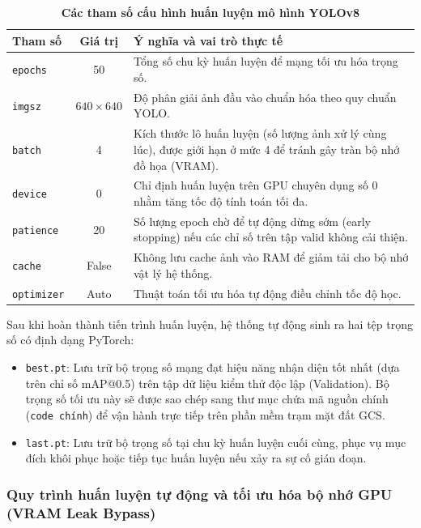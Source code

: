 \begin{table}[H]
    \centering
    \caption[Các tham số cấu hình huấn luyện mô hình YOLOv8]{\bfseries\fontsize{12pt}{0pt}\selectfont Các tham số cấu hình huấn luyện mô hình YOLOv8}
    \begin{tabular}{|l|c|p{8cm}|}
    \hline
    \rowcolor{LightCyan}
    \textbf{Tham số} & \textbf{Giá trị} & \textbf{Ý nghĩa và vai trò thực tế} \\ \hline
    \texttt{epochs} & 50 & Tổng số chu kỳ huấn luyện để mạng tối ưu hóa trọng số. \\ \hline
    \texttt{imgsz} & $640 \times 640$ & Độ phân giải ảnh đầu vào chuẩn hóa theo quy chuẩn YOLO. \\ \hline
    \texttt{batch} & 4 & Kích thước lô huấn luyện (số lượng ảnh xử lý cùng lúc), được giới hạn ở mức 4 để tránh gây tràn bộ nhớ đồ họa (VRAM). \\ \hline
    \texttt{device} & 0 & Chỉ định huấn luyện trên GPU chuyên dụng số 0 nhằm tăng tốc độ tính toán tối đa. \\ \hline
    \texttt{patience} & 20 & Số lượng epoch chờ để tự động dừng sớm (early stopping) nếu các chỉ số trên tập valid không cải thiện. \\ \hline
    \texttt{cache} & False & Không lưu cache ảnh vào RAM để giảm tải cho bộ nhớ vật lý hệ thống. \\ \hline
    \texttt{optimizer} & Auto & Thuật toán tối ưu hóa tự động điều chỉnh tốc độ học. \\ \hline
    \end{tabular}
    \label{tab:training_hyperparameters}
\end{table}

Sau khi hoàn thành tiến trình huấn luyện, hệ thống tự động sinh ra hai tệp trọng số có định dạng PyTorch:
\begin{itemize}
    \item \texttt{best.pt}: Lưu trữ bộ trọng số mạng đạt hiệu năng nhận diện tốt nhất (dựa trên chỉ số mAP@0.5) trên tập dữ liệu kiểm thử độc lập (Validation). Bộ trọng số tối ưu này sẽ được sao chép sang thư mục chứa mã nguồn chính (\texttt{code chính}) để vận hành trực tiếp trên phần mềm trạm mặt đất GCS.
    \item \texttt{last.pt}: Lưu trữ bộ trọng số tại chu kỳ huấn luyện cuối cùng, phục vụ mục đích khôi phục hoặc tiếp tục huấn luyện nếu xảy ra sự cố gián đoạn.
\end{itemize}

\subsubsection{Quy trình huấn luyện tự động và tối ưu hóa bộ nhớ GPU (VRAM Leak Bypass)}

